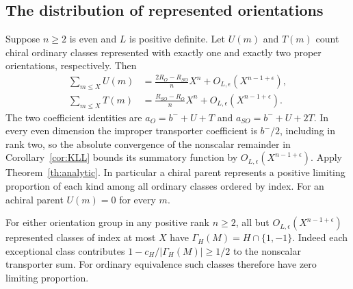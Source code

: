 \subsection*{The distribution of represented orientations}
Suppose \(n\ge2\) is even and \(L\) is positive definite. Let \(U(m)\) and \(T(m)\) count chiral ordinary classes represented with exactly one and exactly two proper orientations, respectively. Then
\[
\begin{aligned}
 \sum_{m\le X}U(m)&=\frac{2R_O-R_{SO}}{n}X^n+
                         O_{L,\epsilon}(X^{n-1+\epsilon}),\\
 \sum_{m\le X}T(m)&=\frac{R_{SO}-R_O}{n}X^n+
                         O_{L,\epsilon}(X^{n-1+\epsilon}).
\end{aligned}
\]
The two coefficient identities are \(a_O=b^-+U+T\) and
\(a_{SO}=b^-+U+2T\). In every even dimension the improper transporter coefficient is \(b^-/2\), including in rank two, so the absolute convergence of the nonscalar remainder in Corollary~\ref{cor:KLL} bounds its summatory function by \(O_{L,\epsilon}(X^{n-1+\epsilon})\). Apply Theorem~\ref{th:analytic}. In particular a chiral parent represents a positive limiting proportion of each kind among all ordinary classes ordered by index. For an achiral parent \(U(m)=0\) for every \(m\).

For either orientation group in any positive rank \(n\ge2\), all but \(O_{L,\epsilon}(X^{n-1+\epsilon})\) represented classes of index at most \(X\) have \(\Gamma_H(M)=H\cap\{1,-1\}\). Indeed each exceptional class contributes \(1-c_H/|\Gamma_H(M)|\ge1/2\) to the nonscalar transporter sum. For ordinary equivalence such classes therefore have zero limiting proportion.

